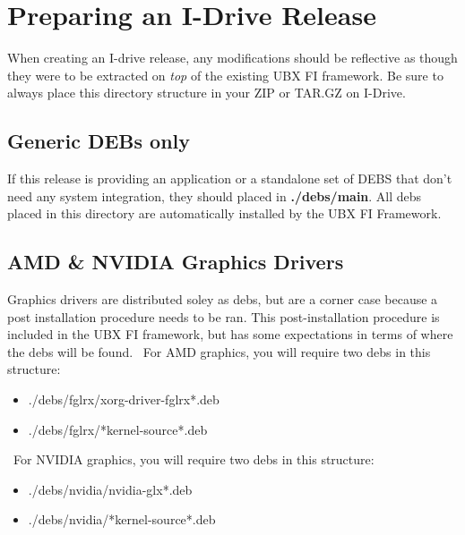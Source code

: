 \documentclass[letterpaper,10pt,titlepage]{article}
\begin{document}
\section{Preparing an I-Drive Release}
When creating an I-drive release, any modifications should be reflective as though they were to be extracted on \textit{top} of  the existing UBX FI framework.  Be sure to always place this directory structure in your ZIP or TAR.GZ on I-Drive.

\subsection{Generic DEBs only}
If this release is providing an application or a standalone set of DEBS that don't need any system integration, they should placed in
\textbf{./debs/main}.  All debs placed in this directory are automatically installed by the UBX FI Framework.

\subsection{ AMD \& NVIDIA Graphics Drivers}
Graphics drivers are distributed soley as debs, but are a corner case because a post installation procedure needs to be ran.  This post-installation procedure is included in the UBX FI framework, but has some expectations in terms of where the debs will be found.
\
For AMD graphics, you will require two debs in this structure:
\begin{itemize}
\item ./debs/fglrx/xorg-driver-fglrx*.deb
\item ./debs/fglrx/*kernel-source*.deb
\end{itemize}
\
For NVIDIA graphics, you will require two debs in this structure:
\begin{itemize}
\item ./debs/nvidia/nvidia-glx*.deb
\item ./debs/nvidia/*kernel-source*.deb
\end{itemize}
\end{document}

